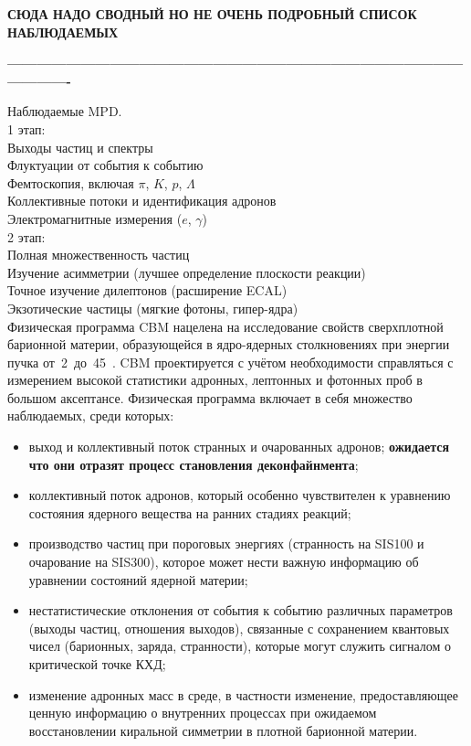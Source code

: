 
\textbf{СЮДА НАДО СВОДНЫЙ НО НЕ ОЧЕНЬ ПОДРОБНЫЙ СПИСОК НАБЛЮДАЕМЫХ}

\textbf{----------------------------------------------------------------------------------------------------------}

Наблюдаемые MPD. \\
1 этап: \\
Выходы частиц и спектры \\
Флуктуации от события к событию \\
Фемтоскопия, включая $\pi$, $K$, $p$, $\Lambda$ \\
Коллективные потоки и идентификация адронов \\
Электромагнитные измерения ($e$, $\gamma$) \\

2 этап: \\
Полная множественность частиц \\
Изучение асимметрии (лучшее определение плоскости реакции) \\
Точное изучение дилептонов (расширение ECAL) \\
Экзотические частицы (мягкие фотоны, гипер-ядра) \\


Физическая программа CBM нацелена на исследование свойств сверхплотной барионной материи, образующейся в ядро-ядерных столкновениях при энергии пучка от~2~до~45~\GeVperNucl{}. CBM проектируется с учётом необходимости справляться с измерением высокой статистики адронных, лептонных и фотонных проб в большом аксептансе. Физическая программа включает в себя множество наблюдаемых, среди которых:

\begin{itemize}
\item выход и коллективный поток странных и очарованных адронов; \todo \textbf{ожидается что они отразят процесс становления деконфайнмента};
\item коллективный поток адронов, который особенно чувствителен к уравнению состояния ядерного вещества на ранних стадиях реакций;
\item производство частиц при пороговых энергиях (странность на SIS100 и очарование на SIS300), которое может нести важную информацию об уравнении состояний ядерной материи;
\item нестатистические отклонения от события к событию различных параметров (выходы частиц, отношения выходов), связанные с сохранением квантовых чисел (барионных, заряда, странности), которые могут служить сигналом о критической точке КХД;
\item изменение адронных масс в среде, в частности изменение, предоставляющее ценную информацию о внутренних процессах при ожидаемом восстановлении киральной симметрии в плотной барионной материи.
\end{itemize}

